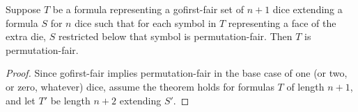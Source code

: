\documentclass{article}
\begin{document}
\begin{theorem}
	Suppose \(T\) be a formula representing a gofirst-fair set of \(n+1\) dice
	extending a formula \(S\) for \(n\) dice such that for each symbol in
	\(T\) representing a face of the extra die, \(S\) restricted below that
	symbol is permutation-fair. Then \(T\) is permutation-fair.
\end{theorem}

\begin{proof}
	Since gofirst-fair implies permutation-fair in the base case of one
	(or two, or zero, whatever) dice, assume the theorem holds for formulas
	\(T\) of length \(n+1\), and let \(T'\) be length \(n+2\) extending \(S'\).
\end{proof}
\end{document}
